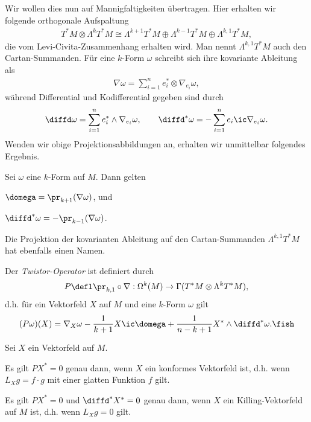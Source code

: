 \documentclass[%
	paper=a5,%
	fleqn,%
	DIV=18,%
	BCOR=0mm,
	fontsize=11pt,
	titlepage=false,%
	bibliography=totoc,
	DIV=18,%
	twoside=true,
	pdftitle=Riemannsche Geometrie,
	pdfauthor=Uwe Semmelmann,
	numbers=noendperiod]%
	{scrbook}
\begin{document}
Wir wollen dies nun auf Mannigfaltigkeiten übertragen. Hier erhalten wir folgende orthogonale Aufspaltung
\begin{align*}
T^*M \otimes \Lambda^k T^*M \cong \Lambda^{k+1}T^*M \oplus \Lambda^{k-1}T^*M \oplus \Lambda^{k,1}T^*M,
\end{align*}
die vom Levi-Civita-Zusammenhang erhalten wird. Man nennt $\Lambda^{k,1}T^*M$ auch den Cartan-Summanden. Für eine $k$-Form $\omega$ schreibt sich ihre kovariante Ableitung als
\begin{align*}
\nabla \omega = \sum_{i=1}^n e_{i}^* \otimes \nabla_{e_{i}}\omega,
\end{align*}
während Differential und Kodifferential gegeben sind durch
\begin{align*}
\diffd \omega = \sum_{i=1}^n e_{i}^* \wedge \nabla_{e_{i}}\omega,\qquad
\diffd^* \omega = -\sum_{i=1}^n e_{i} \ic \nabla_{e_{i}}\omega.
\end{align*}
Wenden wir obige Projektionsabbildungen an, erhalten wir unmittelbar folgendes Ergebnis.

\begin{lem}
Sei $\omega$ eine $k$-Form auf $M$. Dann gelten
\begin{propenum}
\item $\domega = \pr_{k+1}(\nabla \omega)$, und
\item $\diffd^*\omega = -\pr_{k-1}(\nabla \omega)$.\fish
\end{propenum}
\end{lem}

Die Projektion der kovarianten Ableitung auf den Cartan-Summanden $\Lambda^{k,1}T^*M$ hat ebenfalls einen Namen.

\begin{defn}
Der \emph{Twistor-Operator} ist definiert durch
\begin{align*}
P\defl \pr_{k,1}\circ \nabla : \Omega^k(M)\to \Gamma(T^*M\otimes \Lambda^k T^*M),
\end{align*}
d.h. für ein Vektorfeld $X$ auf $M$ und eine $k$-Form $\omega$ gilt
\begin{align*}
(P\omega)(X) = \nabla_{X}\omega - \frac{1}{k+1}X \ic \domega + \frac{1}{n-k+1} X^*\wedge \diffd^*\omega.\fish
\end{align*}
\end{defn}

\begin{lem}
\label{lem:Killing-Twistor}
Sei $X$ ein Vektorfeld auf $M$.
\begin{propenum}
\item Es gilt $PX^* = 0$ genau dann, wenn $X$ ein konformes Vektorfeld ist, d.h. wenn $L_{X}g = f\cdot g$ mit einer glatten Funktion $f$ gilt.
\item Es gilt $PX^* = 0$ und $\diffd^* X^* = 0$ genau dann, wenn $X$ ein Killing-Vektorfeld auf $M$ ist, d.h. wenn $L_{X}g = 0$ gilt.\fish
\end{propenum}
\end{lem}
\end{document}
